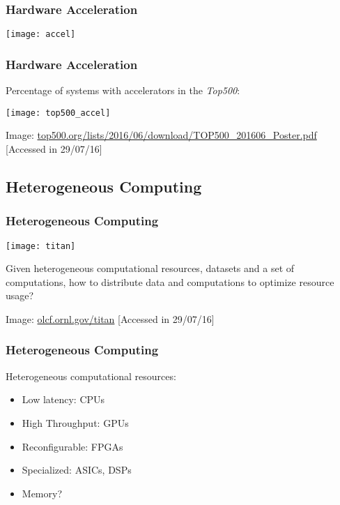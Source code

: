 \documentclass[10pt, compress]{beamer}
\begin{document}
\begin{frame}
    \frametitle{Hardware Acceleration}
    \centering
    \texttt{[image: accel]}
\end{frame}

\begin{frame}
    \frametitle{Hardware Acceleration}
    Percentage of systems with accelerators in the \textit{Top500}:

    \begin{center}
    \texttt{[image: top500\_accel]}
    \hfill

        \tiny{Image: \url{top500.org/lists/2016/06/download/TOP500_201606_Poster.pdf} [Accessed in 29/07/16]}
    \end{center}
\end{frame}

\subsection{Heterogeneous Computing}

\begin{frame}
    \frametitle{Heterogeneous Computing}
    \begin{center}
        \texttt{[image: titan]}
    \end{center}



    Given \alert{heterogeneous} computational resources, \alert{datasets}
    and a set of \alert{computations}, how to distribute data and computations
    to \alert{optimize resource usage}?
    \hfill

    \begin{center}
    \tiny{Image: \url{olcf.ornl.gov/titan} [Accessed in 29/07/16]}
    \end{center}
\end{frame}

\begin{frame}
    \frametitle{Heterogeneous Computing}
    \alert{Heterogeneous} computational resources:

    \begin{itemize}
        \item Low latency: CPUs

        \item High Throughput: GPUs

        \item Reconfigurable: FPGAs

        \item Specialized: ASICs, DSPs

        \item Memory?
    \end{itemize}
\end{frame}
\end{document}
